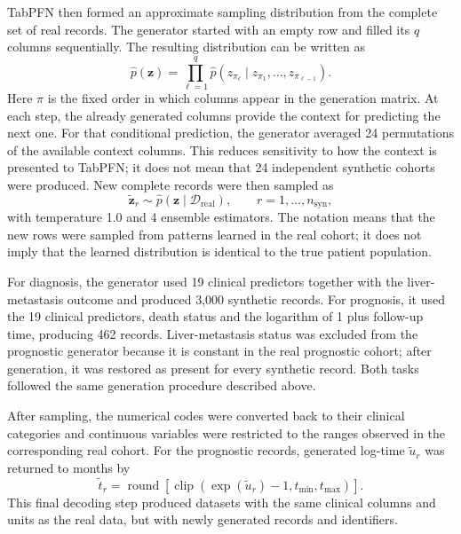 TabPFN then formed an approximate sampling distribution from the complete set of
real records. The generator started with an empty row and filled its $q$ columns
sequentially. The resulting distribution can be written as
\begin{equation}
  \widehat p(\mathbf{z})
  =\prod_{\ell=1}^{q}
  \widehat p\!\left(z_{\pi_\ell}\mid
  z_{\pi_1},\ldots,z_{\pi_{\ell-1}}\right).
  \label{eq:transforms:synthetic-factorisation}
\end{equation}
Here $\pi$ is the fixed order in which columns appear in the generation matrix.
At each step, the already generated columns provide the context for predicting
the next one. For that conditional prediction, the generator averaged 24
permutations of the available context columns. This reduces sensitivity to how
the context is presented to TabPFN; it does not mean that 24 independent
synthetic cohorts were produced. New complete records were then sampled as
\begin{equation}
  \widetilde{\mathbf{z}}_r\sim
  \widehat p(\mathbf{z}\mid\mathcal{D}_{\mathrm{real}}),
  \qquad r=1,\ldots,n_{\mathrm{syn}},
  \label{eq:transforms:synthetic-sampling}
\end{equation}
with temperature 1.0 and 4 ensemble estimators. The notation means that the new
rows were sampled from patterns learned in the real cohort; it does not imply
that the learned distribution is identical to the true patient population.

For diagnosis, the generator used 19 clinical predictors together with the
liver-metastasis outcome and produced 3,000 synthetic records. For prognosis, it
used the 19 clinical predictors, death status and the logarithm of 1 plus
follow-up time, producing 462 records. Liver-metastasis status was excluded from
the prognostic generator because it is constant in the real prognostic cohort;
after generation, it was restored as present for every synthetic record. Both
tasks followed the same generation procedure described above.

After sampling, the numerical codes were converted back to their clinical
categories and continuous variables were restricted to the ranges observed in
the corresponding real cohort. For the prognostic records, generated log-time
$\widetilde u_r$ was returned to months by
\begin{equation}
  \widetilde t_r = \operatorname{round}\!\left[
  \operatorname{clip}\!\left(\exp(\widetilde u_r)-1,
  t_{\min},t_{\max}\right)\right].
  \label{eq:transforms:time-decoding}
\end{equation}
This final decoding step produced datasets with the same clinical columns and
units as the real data, but with newly generated records and identifiers.

